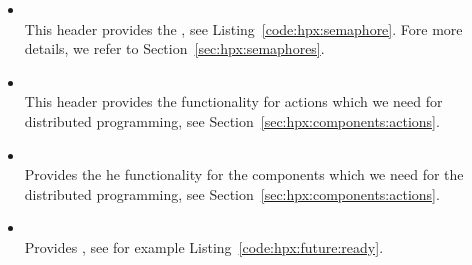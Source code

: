\begin{itemize}
\item {} \\
This header provides the , see Listing~\ref{code:hpx:semaphore}. Fore more details, we refer to Section~\ref{sec:hpx:semaphores}. 

\item {} \\
This header provides the functionality for actions which we need for distributed programming, see Section~\ref{sec:hpx:components:actions}.

\item {} \\
Provides the he functionality for the components which we need for the distributed programming, see Section~\ref{sec:hpx:components:actions}.

\item {} \\
Provides , see for example Listing~\ref{code:hpx:future:ready}.
\end{itemize}

\newpage
\theendnotes